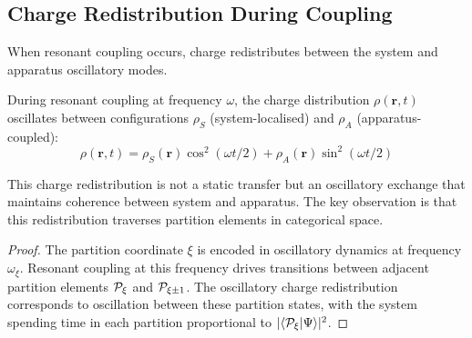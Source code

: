 \subsection{Charge Redistribution During Coupling}

When resonant coupling occurs, charge redistributes between the system and apparatus oscillatory modes.

\begin{definition}
\label{def:charge_transfer}
During resonant coupling at frequency $\omega$, the charge distribution $\rho(\mathbf{r}, t)$ oscillates between configurations $\rho_S$ (system-localised) and $\rho_A$ (apparatus-coupled):
\begin{equation}
\rho(\mathbf{r}, t) = \rho_S(\mathbf{r}) \cos^2(\omega t/2) + \rho_A(\mathbf{r}) \sin^2(\omega t/2)
\end{equation}
\end{definition}

This charge redistribution is not a static transfer but an oscillatory exchange that maintains coherence between system and apparatus. The key observation is that this redistribution traverses partition elements in categorical space.


\begin{proof}
The partition coordinate $\xi$ is encoded in oscillatory dynamics at frequency $\omega_\xi$. Resonant coupling at this frequency drives transitions between adjacent partition elements $\mathcal{P}_{\xi}$ and $\mathcal{P}_{\xi \pm 1}$. The oscillatory charge redistribution corresponds to oscillation between these partition states, with the system spending time in each partition proportional to $|\langle \mathcal{P}_\xi | \Psi \rangle|^2$.
\end{proof}

